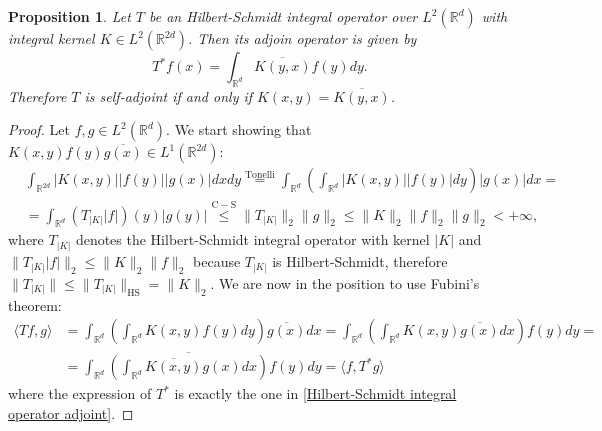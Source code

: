 \documentclass[corpo=11pt, stile=classica, tipotesi=custom,
greek, evenboxes, english]{toptesi}
\numberwithin{equation}{chapter}
\newtheorem{prop}[teo]{Proposition}
\theoremstyle{remark}
\newcommand{\R}{\mathbb{R}} %
\begin{document}
\begin{prop}\label{condition integral operator self-adjoint}
	Let $T$ be an Hilbert-Schmidt integral operator over $L^2(\R^d)$ with integral kernel $K \in L^2(\R^{2d})$. Then its adjoin operator is given by
	\begin{equation}\label{Hilbert-Schmidt integral operator adjoint}
		T^*f(x) = \int_{\R^d} \overline{K(y,x)} f(y)dy.
	\end{equation}
	Therefore $T$ is self-adjoint if and only if $K(x,y) = \overline{K(y,x)}$.
\end{prop}
\begin{proof}
	Let $f,g \in L^2(\R^d)$. We start showing that $K(x,y)f(y)\overline{g(x)} \in L^1(\R^{2d})$:
	\begin{align*}
		&\int_{\R^{2d}} |K(x,y)| |f(y)| |g(x)| dxdy \overset{\mathrm{Tonelli}}{=} \int_{\R^d} \left(\int_{\R^d} |K(x,y)||f(y)| dy\right) |g(x)| dx = \\
		&= \int_{\R^d} (T_{|K|} |f|)(y) |g(y)| \overset{\mathrm{C-S}}{\leq} \|T_{|K|}\|_2 \|g\|_2 \leq \|K\|_2 \| f \|_2 \|g\|_2 < +\infty,
	\end{align*}
	where $T_{|K|}$ denotes the Hilbert-Schmidt integral operator with kernel $|K|$ and $\|T_{|K|}|f|\|_2 \leq \|K\|_2 \| f \|_2$ because $T_{|K|}$ is Hilbert-Schmidt, therefore $\|T_{|K|}\| \leq \|T_{|K|}\|_{\mathrm{HS}} = \| K \|_2$. We are now in the position to use Fubini's theorem:
	\begin{align*}
		\langle Tf,g \rangle &= \int_{\R^d} \left(\int_{\R^d} K(x,y)f(y)dy\right)\overline{g(x)}dx = \int_{\R^d} \left(\int_{\R^d} K(x,y)\overline{g(x)}dx\right) f(y)dy =\\
							 &= \int_{\R^d} \overline{\left(\int_{\R^d} \overline{K(x,y)} g(x)dx\right)} f(y)dy = \langle f,T^*g \rangle
	\end{align*}
	where the expression of $T^*$ is exactly the one in \eqref{Hilbert-Schmidt integral operator adjoint}.
\end{proof}
\end{document}
